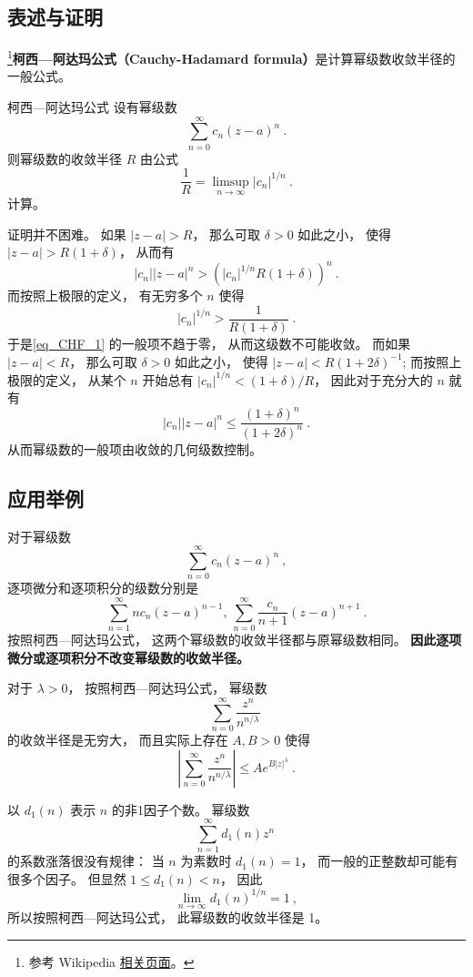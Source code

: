 

\subsection{表述与证明}

\footnote{参考 Wikipedia \href{https://en.wikipedia.org/wiki/Cauchy-Hadamard_theorem}{相关页面}。}\textbf{柯西—阿达玛公式（Cauchy-Hadamard formula）}是计算幂级数收敛半径的一般公式。

\begin{theorem}{柯西—阿达玛公式}
设有幂级数
\begin{equation}\label{eq_CHF_1}
\sum_{n=0}^\infty c_n(z-a)^n~.
\end{equation}
则幂级数的收敛半径 $R$ 由公式
$$
\frac{1}{R}=\limsup_{n\to\infty}|c_n|^{1/n}~.
$$
计算。
\end{theorem}
证明并不困难。 如果 $|z-a|>R$， 那么可取 $\delta>0$ 如此之小， 使得 $|z-a|>R(1+\delta)$， 从而有
$$
|c_n||z-a|^n>(|c_n|^{1/n}R(1+\delta))^n~.
$$
而按照上极限的定义， 有无穷多个 $n$ 使得
$$
|c_n|^{1/n}>\frac{1}{R(1+\delta)}~.
$$
于是\autoref{eq_CHF_1} 的一般项不趋于零， 从而这级数不可能收敛。 而如果 $|z-a|<R$， 那么可取 $\delta>0$ 如此之小， 使得 $|z-a|<R(1+2\delta)^{-1}$; 而按照上极限的定义， 从某个 $n$ 开始总有 $|c_n|^{1/n}<(1+\delta)/R$， 因此对于充分大的 $n$ 就有
$$
|c_n||z-a|^n\leq\frac{(1+\delta)^n}{(1+2\delta)^n}~.
$$
从而幂级数的一般项由收敛的几何级数控制。

\subsection{应用举例}
对于幂级数
$$
\sum_{n=0}^\infty c_n(z-a)^n~,
$$
逐项微分和逐项积分的级数分别是
$$
\sum_{n=1}^\infty nc_n(z-a)^{n-1},\,
\sum_{n=0}^\infty \frac{c_n}{n+1}(z-a)^{n+1}~.
$$
按照柯西—阿达玛公式， 这两个幂级数的收敛半径都与原幂级数相同。 \textbf{因此逐项微分或逐项积分不改变幂级数的收敛半径。}

对于 $\lambda>0$， 按照柯西—阿达玛公式， 幂级数
$$
\sum_{n=0}^\infty\frac{z^n}{n^{n/\lambda}}~
$$
的收敛半径是无穷大， 而且实际上存在 $A,B>0$ 使得
$$
\left|\sum_{n=0}^\infty\frac{z^n}{n^{n/\lambda}}\right|
\leq Ae^{B|z|^\lambda}~.
$$

以 $d_1(n)$ 表示 $n$ 的非1因子个数。 幂级数
$$
\sum_{n=1}^\infty d_1(n)z^n~
$$
的系数涨落很没有规律： 当 $n$ 为素数时 $d_1(n)=1$， 而一般的正整数却可能有很多个因子。 但显然 $1\leq d_1(n)<n$， 因此
$$
\lim_{n\to\infty}d_1(n)^{1/n}=1~,
$$
所以按照柯西—阿达玛公式， 此幂级数的收敛半径是 1。